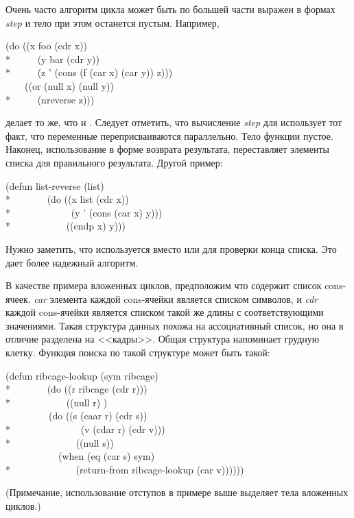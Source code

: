 \begin{defmac}
Очень часто алгоритм цикла может быть по большей части выражен в формах
\emph{step} и тело при этом останется пустым.
Например,
\begin{lisp}
(do ((x foo (cdr x)) \\*
~~~~~(y bar (cdr y)) \\*
~~~~~(z '{\emptylist} (cons (f (car x) (car y)) z))) \\
~~~~((or (null x) (null y)) \\*
~~~~~(nreverse z)))
\end{lisp}
делает то же, что и . Следует отметить, что вычисление
\emph{step} для  использует тот факт, что переменные переприсваиваются
параллельно.
Тело функции пустое. Наконец, использование  в форме возврата
результата, переставляет элементы списка для правильного результата. Другой
пример:
\begin{lisp}
(defun list-reverse (list) \\*
~~~~~~~(do ((x list (cdr x)) \\*
~~~~~~~~~~~~(y '{\emptylist} (cons (car x) y))) \\*
~~~~~~~~~~~((endp x) y)))
\end{lisp}
Нужно заметить, что используется  вместо  или 
для проверки конца списка. Это дает более надежный алгоритм.

В качестве примера вложенных циклов, предположим что  содержит список
cons-ячеек.
\emph{car} элемента каждой cons-ячейки является списком символов, и \emph{cdr}
каждой cons-ячейки является списком такой же длины с соответствующими
значениями.
Такая структура данных похожа на ассоциативный список, но она в отличие
разделена на <<кадры>>. Общая структура напоминает грудную клетку.
Функция поиска по такой структуре может быть такой:
\begin{lisp}
(defun ribcage-lookup (sym ribcage) \\*
~~~~~~~(do ((r ribcage (cdr r))) \\*
~~~~~~~~~~~((null r) {\false}) \\
~~~~~~~~~(do ((s (caar r) (cdr s)) \\*
~~~~~~~~~~~~~~(v (cdar r) (cdr v))) \\*
~~~~~~~~~~~~~((null s)) \\
~~~~~~~~~~~(when (eq (car s) sym) \\*
~~~~~~~~~~~~~(return-from ribcage-lookup (car v))))))
\end{lisp}
(Примечание, использование отступов в примере выше выделяет тела вложенных
циклов.) 


\end{defmac}
